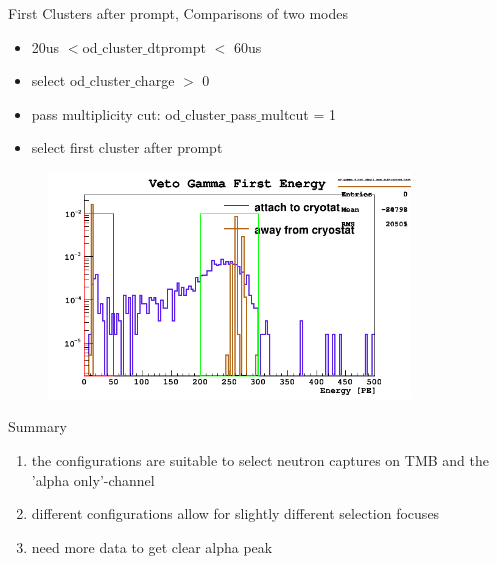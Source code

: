 \documentclass[9pt]{beamer}
\begin{document}
\begin{frame}{First Clusters after prompt, Comparisons of two modes}
  \begin{itemize}
  [bullet]
\item 20us $<$od$\_$cluster$\_$dtprompt $<$ 60us
\item  select od$\_$cluster$\_$charge $>$ 0
\item pass multiplicity cut: od$\_$cluster$\_$pass$\_$multcut = 1
  \item select first cluster after prompt
 \end{itemize} 
\begin{figure}
\includegraphics[height= 6cm, width=.8\textwidth]{first_ene_Feb7PM.png}
\end{figure}
\end{frame}

\begin{frame}{Summary}
\begin{enumerate}
\item the configurations are suitable to select neutron captures on TMB and the 'alpha only'-channel
\item different configurations allow for slightly different selection focuses
\item need more data to get clear alpha peak 
\end{enumerate}
\end{frame}
\end{document}
